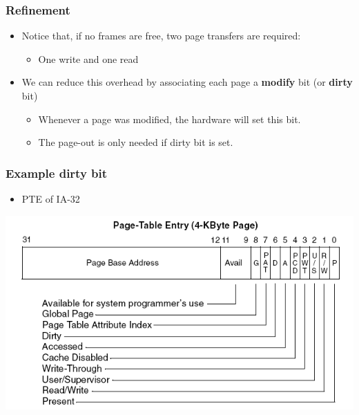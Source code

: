 \documentclass[CJKutf8,xcolor=pdftex,dvipsnames,table]{beamer}
\begin{document}
\begin{CJK*}{UTF8}{song}
  \begin{frame}
    \frametitle{Refinement} \pause
    \begin{itemize}
    \item{Notice that, if no frames are free, two page transfers are required: } \pause
      \begin{itemize}
      \item{One write and one read} \pause
      \end{itemize}
    \item{We can reduce this overhead by associating each page a \textbf{modify} bit (or \textbf{dirty} bit)} \pause
      \begin{itemize}
      \item{Whenever a page was modified, the hardware will set this bit.} \pause
      \item{The page-out is only needed if dirty bit is set.}
      \end{itemize}
    \end{itemize}
  \end{frame}
  
  \begin{frame}
    \frametitle{Example dirty bit} \pause
    \begin{itemize}
    \item{PTE of IA-32} \pause
    \end{itemize}
    \begin{center}
      \includegraphics[scale=.5]{x86pte}
    \end{center}
  \end{frame}
  

\end{CJK*}
\end{document}
